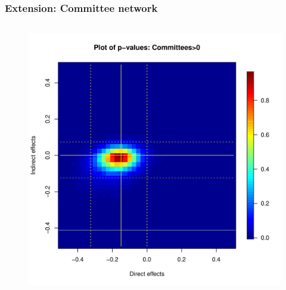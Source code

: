 \documentclass{beamer}
\begin{document}
\begin{frame}
\begin{columns}[c]
\end{columns}
\end{frame}


\begin{frame}
\frametitle{Extension: Committee network}
\vspace{-10mm}
\begin{columns}[c]

\begin{figure}
\centering
\includegraphics[trim = 11mm 0mm 9mm 0mm, clip, scale=0.39]{pval_plot_coppock_committee_1ormore.pdf}
\end{figure}


\end{columns}
\end{frame}
\end{document}

